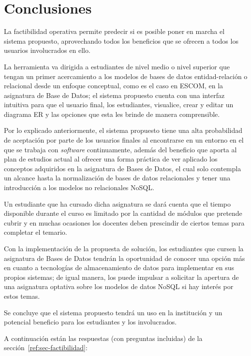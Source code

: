 \section{Conclusiones}

La factibilidad operativa permite predecir si es posible poner en marcha el sistema propuesto, aprovechando todos los beneficios que se ofrecen a todos los usuarios involucrados en ello.


La herramienta va dirigida a estudiantes de nivel medio o nivel superior que tengan un primer acercamiento a los modelos de bases de datos entidad-relación o relacional desde un enfoque conceptual, como es el caso en ESCOM, en la asignatura de Base de Datos; el sistema propuesto cuenta con una interfaz intuitiva para que el usuario final, los estudiantes, visualice, crear y editar un diagrama ER y las opciones que esta les brinde de manera comprensible.


Por lo explicado anteriormente, el sistema propuesto tiene una alta probabilidad de aceptación por parte de los usuarios finales al encontrarse en un entorno en el que se trabaja con \textit{software} continuamente, además del beneficio que aporta al plan de estudios actual al ofrecer una forma práctica de ver aplicado los conceptos adquiridos en la asignatura de Bases de Datos, el cual solo contempla un alcance hasta la normalización de bases de datos relacionales y tener una introducción a los modelos no relacionales NoSQL.


Un estudiante que ha cursado dicha asignatura se dará cuenta que el tiempo disponible durante el curso es limitado por la cantidad de módulos que pretende cubrir y en muchas ocasiones los docentes deben prescindir de ciertos temas para completar el temario.


Con la implementación de la propuesta de solución, los estudiantes que cursen la asignatura de Bases de Datos tendrán la oportunidad de conocer una opción más en cuanto a tecnologías de almacenamiento de datos para implementar en sus propios sistemas; de igual manera, los puede impulsar a solicitar la apertura de una asignatura optativa sobre los modelos de datos NoSQL si hay interés por estos temas.


Se concluye que el sistema propuesto tendrá un uso en la institución y un potencial beneficio para los estudiantes y los involucrados.


A continuación están las respuestas (con preguntas incluidas) de la sección~\ref{ref:sec-factibilidad}:


